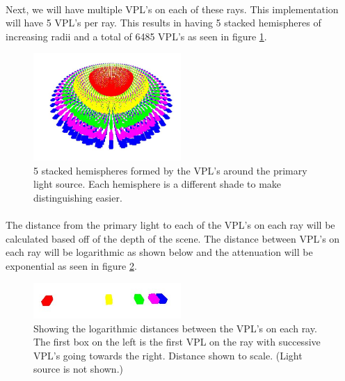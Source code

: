 \paragraph{}
Next, we will have multiple VPL's on each of these rays.  This implementation will have 5 VPL's per ray.  This results in having 5 stacked hemispheres of increasing radii and a total of 6485 VPL's as seen in figure \ref{fig:3.4}.

\begin{figure}[h!]
  \centering
    \includegraphics[width=0.5\textwidth]{Figure34.jpg}
  \caption{5 stacked hemispheres formed by the VPL's around the primary light source. Each hemisphere is a different shade to make distinguishing easier.}
	\label{fig:3.4}
\end{figure}

\paragraph{}
The distance from the primary light to each of the VPL's on each ray will be calculated based off of the depth of the scene.  The distance between VPL's on each ray will be logarithmic as shown below and the attenuation will be exponential as seen in figure \ref{fig:3.5}.

\begin{figure}[h!]
  \centering
    \includegraphics[width=0.5\textwidth]{Figure35.jpg}
  \caption{Showing the logarithmic distances between the VPL's on each ray.  The first box on the left is the first VPL on the ray with successive VPL's going towards the right. Distance shown to scale. (Light source is not shown.)}
	\label{fig:3.5}
\end{figure}

